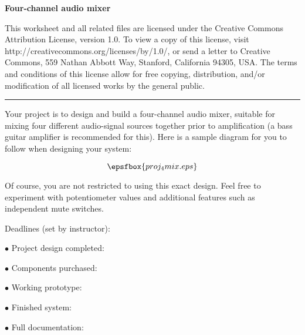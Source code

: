 
\centerline{\bf Four-channel audio mixer} \bigskip 
 
This worksheet and all related files are licensed under the Creative Commons Attribution License, version 1.0.  To view a copy of this license, visit http://creativecommons.org/licenses/by/1.0/, or send a letter to Creative Commons, 559 Nathan Abbott Way, Stanford, California 94305, USA.  The terms and conditions of this license allow for free copying, distribution, and/or modification of all licensed works by the general public.

\bigskip 

\hrule

\vskip 10pt

Your project is to design and build a four-channel audio mixer, suitable for mixing four different audio-signal sources together prior to amplification (a bass guitar amplifier is recommended for this).  Here is a sample diagram for you to follow when designing your system:

$$\epsfbox{proj_4mix.eps}$$

Of course, you are not restricted to using this exact design.  Feel free to experiment with potentiometer values and additional features such as independent mute switches.

\vskip 10pt

\goodbreak
\noindent
Deadlines (set by instructor):

\medskip
\item{$\bullet$} Project design completed: 
\item{$\bullet$} Components purchased:
\item{$\bullet$} Working prototype:
\item{$\bullet$} Finished system:
\item{$\bullet$} Full documentation:
\medskip



